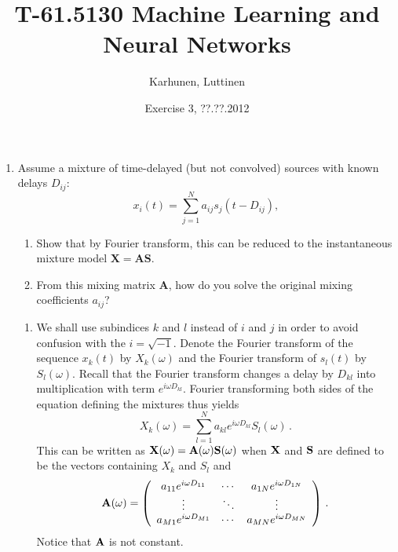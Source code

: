
\title{T-61.5130 Machine Learning and Neural Networks}
\author{Karhunen, Luttinen}
\date{Exercise 3, ??.??.2012}

\newcommand{\vect}[1]{{\bf{#1}}}
\newcommand{\svect}[1]{\boldsymbol{#1}}
\newcommand{\matr}[1]{\boldsymbol{#1}}




\maketitle

\begin{enumerate}


\item Assume a mixture of time-delayed (but not convolved) sources with known delays $D_{ij}$:
  \begin{displaymath}
    x_i(t) = \sum_{j=1}^N a_{ij}s_j(t-D_{ij}),
  \end{displaymath}
  \begin{enumerate}
  \item Show that by Fourier transform, this can be reduced to the instantaneous mixture
    model $\mathbf{X} = \mathbf{A} \mathbf{S}$.
  \item From this mixing matrix $\mathbf{A}$, how do you solve the original mixing
    coefficients $a_{ij}$?
  \end{enumerate}

  \begin{solution}


    \begin{enumerate}
    \item We shall use subindices $k$ and $l$ instead of $i$ and $j$ in
      order to avoid confusion with the $i = \sqrt{-1}$.  Denote the
      Fourier transform of the sequence $x_k(t)$ by $X_k(\omega)$ and
      the Fourier transform of $s_l(t)$ by $S_l(\omega)$.  Recall that
      the Fourier transform changes a delay by $D_{kl}$ into
      multiplication with term $e^{i\omega D_{kl}}$.  Fourier
      transforming both sides of the equation defining the mixtures thus
      yields $$X_k(\omega) = \sum_{l=1}^N a_{kl} e^{i\omega D_{kl}}
      S_l(\omega) \, .$$ This can be written as $\bf{X}(\omega) =
      \bf{A}(\omega) \bf{S}(\omega)$ when $\bf{X}$ and $\bf{S}$ are
      defined to be the vectors containing $X_k$ and $S_l$ and
      \[
      \bf{A}(\omega) = \left( \begin{array}{ccc} a_{11}e^{i\omega
            D_{11}} & \cdots & a_{1N}e^{i\omega D_{1N}} \\ \vdots & \ddots &
          \vdots \\ a_{M1}e^{i\omega D_{M1}} & \cdots & a_{MN}e^{i\omega
            D_{MN}} \end{array} \right) \, .
      \] Notice that ${\bf A}$ is not
      constant.


\end{enumerate}
\end{solution}
\end{enumerate}
